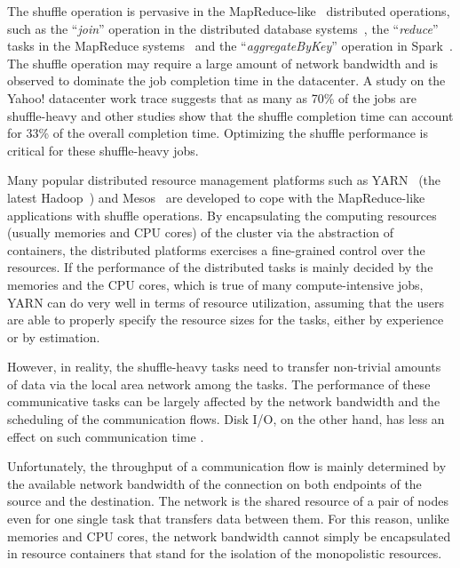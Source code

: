\documentclass[10pt,journal,compsoc]{IEEEtran}
\begin{document}



 

The shuffle operation is pervasive in the MapReduce-like~\cite{dean2008mapreduce} distributed operations, 
such as the ``\emph{join}'' operation in the distributed database systems~\cite{thusoo2009hive, Yu:2008:DSG,Armbrust:2015:SSR}, 
the ``\emph{reduce}'' tasks in the MapReduce systems~\cite{dean2008mapreduce,vavilapalli2013apache}
and the ``\emph{aggregateByKey}'' operation in Spark~\cite{zaharia2012resilient}.
The shuffle operation may require a large amount of network bandwidth 
and is observed to dominate the job completion time in the datacenter.
A study on the Yahoo! datacenter work trace suggests that as many as 70\% of 
the jobs are shuffle-heavy and other studies show that the shuffle completion time
can account for 33\% of the overall completion time.
Optimizing the shuffle performance is critical for these
shuffle-heavy jobs.


Many popular distributed resource management platforms such as YARN~\cite{vavilapalli2013apache} (the latest Hadoop~\cite{white2015hadoop}) and Mesos~\cite{hindman2011mesos} are developed to cope with the 
MapReduce-like applications with shuffle operations. 
By encapsulating the computing resources (usually memories and CPU cores) of the cluster via the abstraction of containers, 
the distributed platforms exercises a fine-grained control over the resources. 
If the performance of the distributed tasks is mainly decided by the
memories and the CPU cores, which is true of
many compute-intensive jobs, YARN can do very well in terms of resource
utilization, assuming that the users are able to properly specify %
the resource sizes for the tasks, either by experience or by estimation. 

However, in reality, the shuffle-heavy tasks need to transfer 
non-trivial amounts of data via the local area network among the tasks.
The performance of these %
communicative tasks can be largely 
affected by the network bandwidth and the scheduling of the communication flows. 
Disk I/O, on the other hand, has less an effect on such communication time \cite{kavulya2010analysis}.

Unfortunately, the throughput of a communication flow is mainly determined by the available network bandwidth of 
the connection on both endpoints of the source and the destination. 
The network is the shared resource of a pair of nodes even for one single task that transfers data between them. 
For this reason, unlike memories and CPU cores, the network bandwidth cannot simply be encapsulated in resource containers that stand for the isolation of the monopolistic resources.
\end{document}
